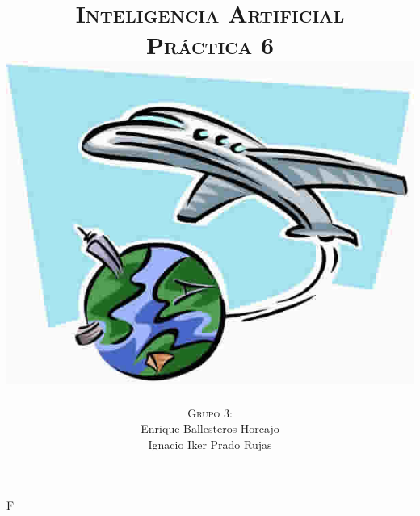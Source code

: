 F\documentclass[11pt, a4paper, spanish, openright, twoside]{book}
\begin{document}
 
\title{\Huge{\textsc{Inteligencia Artificial}} \\
	\vspace{0.7cm}
	 \textsc{\Large{Práctica 6}} \\
	\vspace{1.5cm}
	\includegraphics[scale=0.45]{viaje}}
\author{\textsc{Grupo 3:}\\
	Enrique Ballesteros Horcajo\\
	Ignacio Iker Prado Rujas}
\date{\Today}
\maketitle

\newpage
\mbox{}
\thispagestyle{empty}						%
\newpage


\tableofcontents 							%

\newpage
\mbox{}
\thispagestyle{empty}						%
\newpage


\vspace{3cm}


\newpage
\end{document}
